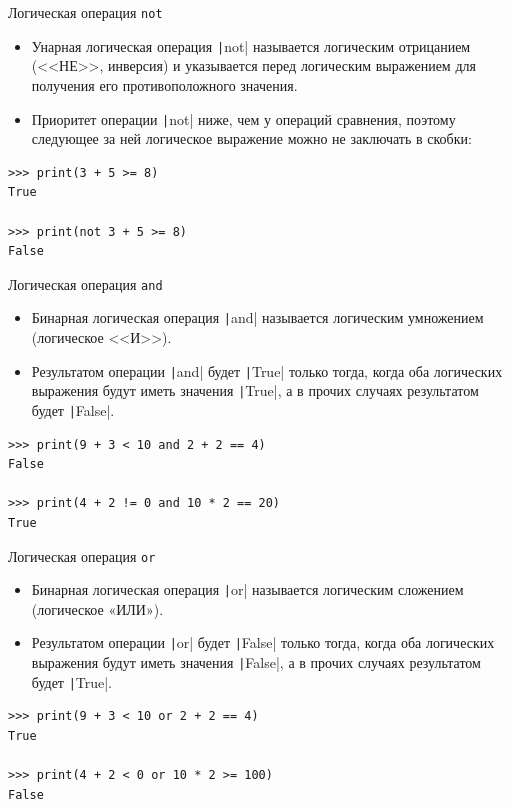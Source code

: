 \documentclass[aspectratio=169, mathserif]{beamer}	%
\begin{document}
\begin{frame}[fragile]{Логическая операция \texttt{not}}
\scriptsize
\begin{itemize}
	\item Унарная логическая операция \texttt|not| называется логическим отрицанием (<<НЕ>>, инверсия) и указывается перед логическим выражением для получения его противоположного значения.
	
	\item Приоритет операции \texttt|not| ниже, чем у операций сравнения, поэтому следующее за ней логическое выражение можно не заключать в скобки:
\end{itemize}
\begin{verbatim}
>>> print(3 + 5 >= 8)
True

>>> print(not 3 + 5 >= 8)
False
\end{verbatim}
\vfill
\end{frame}


\begin{frame}[fragile]{Логическая операция \texttt{and}}
\scriptsize
\begin{itemize}
	\item Бинарная логическая операция \texttt|and| называется логическим умножением (логическое <<И>>).
		
	\item Результатом  операции \texttt|and| будет \texttt|True| только тогда, когда оба логических выражения будут иметь значения \texttt|True|, а в прочих случаях результатом будет \texttt|False|.
\end{itemize}
\begin{verbatim}
>>> print(9 + 3 < 10 and 2 + 2 == 4)
False

>>> print(4 + 2 != 0 and 10 * 2 == 20)
True
\end{verbatim}
\vfill
\end{frame}


\begin{frame}[fragile]{Логическая операция \texttt{or}}
\scriptsize
\begin{itemize}
	\item Бинарная логическая операция \texttt|or| называется логическим сложением (логическое «ИЛИ»).
		
	\item Результатом  операции \texttt|or| будет \texttt|False| только тогда, когда оба логических выражения будут иметь значения \texttt|False|, а в прочих случаях результатом будет \texttt|True|.
\end{itemize}
\begin{verbatim}
>>> print(9 + 3 < 10 or 2 + 2 == 4)
True

>>> print(4 + 2 < 0 or 10 * 2 >= 100)
False
\end{verbatim}
\vfill	
\end{frame}
\end{document}
